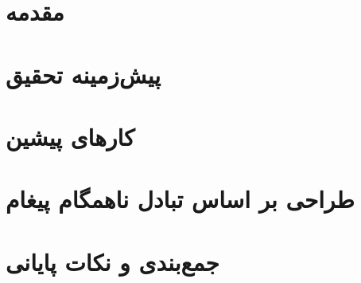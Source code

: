 \documentclass[oneside, a4paper,11pt]{book}
\numberwithin{equation}{chapter}
\numberwithin{table}{chapter}
\numberwithin{figure}{chapter}
\numberwithin{equation}{chapter}
\begin{document}
\setcounter{page}{1}
\setcounter{secnumdepth}{3}
\chapter{مقدمه}
\label{chapter:Introduction}
\thispagestyle{plain}

\chapter{پیش‌زمینه تحقیق}
\label{chapter:Preliminaries}
\thispagestyle{plain}

\chapter{کارهای پیشین}
\label{chapter:RelatedWork}
\thispagestyle{plain}

\chapter{طراحی بر اساس تبادل ناهمگام پیغام}
\label{chapter:proposedFramework}

%
\chapter{جمع‌بندی و نکات پایانی}
\label{chapter:Conclusion}
\thispagestyle{plain}


%
\newpage

\linespread{1.2}

\small{

\clearpage
{}
{}

}

\newpage
\begin{multicols}{2}
\def\glossaryname{واژه‌نامه‌ی فارسی به انگلیسی}
\printglossary
{}
\end{multicols}
\end{document}
